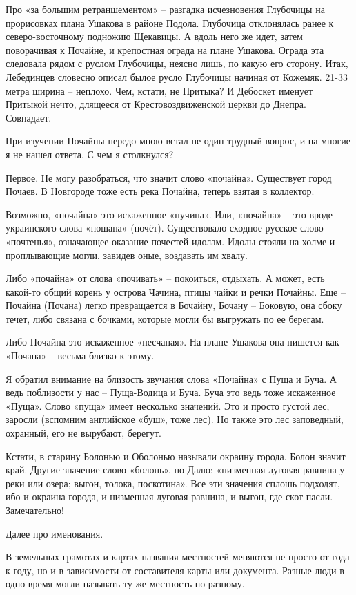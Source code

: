 Про «за большим ретраншементом» – разгадка исчезновения Глубочицы на прорисовках плана Ушакова в районе Подола. Глубочица отклонялась ранее к северо-восточному подножию Щекавицы. А вдоль него же идет, затем поворачивая к Почайне, и крепостная ограда на плане Ушакова. Ограда эта следовала рядом с руслом Глубочицы, неясно лишь, по какую его сторону. Итак, Лебединцев словесно описал былое русло Глубочицы начиная от Кожемяк. 21-33 метра ширина – неплохо. Чем, кстати, не Притыка? И Дебоскет именует Притыкой нечто, длящееся от Крестовоздвиженской церкви до Днепра. Совпадает.

При изучении Почайны передо мною встал не один трудный вопрос, и на многие я не нашел ответа. С чем я столкнулся? 

Первое. Не могу разобраться, что значит слово «почайна». Существует город Почаев. В Новгороде тоже есть река Почайна, теперь взятая в коллектор.

Возможно, «почайна» это искаженное «пучина». Или, «почайна» – это вроде украинского слова «пошана» (почёт). Существовало сходное русское слово «почтенья», означающее оказание почестей идолам. Идолы стояли на холме и проплывающие могли, завидев оные, воздавать им хвалу. 

Либо «почайна» от слова «почивать» – покоиться, отдыхать. А может, есть какой-то общий корень у острова Чачина, птицы чайки и речки Почайны. Еще – Почайна (Почана) легко превращается в Бочайну, Бочану – Боковую, она сбоку течет, либо связана с бочками, которые могли бы выгружать по ее берегам.

Либо Почайна это искаженное «песчаная». На плане Ушакова она пишется как «Почана» – весьма близко к этому.

Я обратил внимание на близость звучания слова «Почайна» с Пуща и Буча. А ведь поблизости у нас – Пуща-Водица и Буча. Буча это ведь тоже искаженное «Пуща». Слово «пуща» имеет несколько значений. Это и просто густой лес, заросли (вспомним английское «буш», тоже лес). Но также это лес заповедный, охранный, его не вырубают, берегут.

Кстати, в старину Болонью и Оболонью называли окраину города. Болон значит край. Другие значение слово «болонь», по Далю: «низменная луговая равнина у реки или  озера; выгон, толока, поскотина». Все эти значения сплошь подходят, ибо и окраина города, и низменная луговая равнина, и выгон, где скот пасли. Замечательно!

Далее про именования.

В земельных грамотах и картах названия местностей меняются не просто от года к году, но и в зависимости от составителя карты или документа. Разные люди в одно время могли называть ту же местность по-разному.

